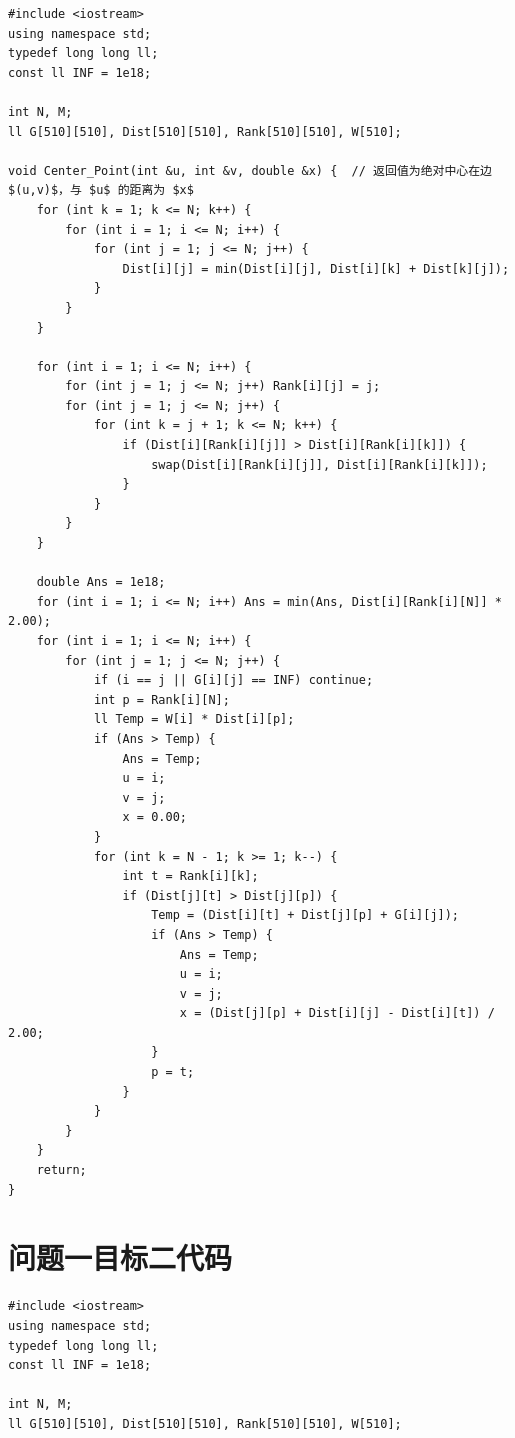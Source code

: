 \documentclass{cumcmthesis}
\begin{document}
\begin{appendices}
\begin{lstlisting}
#include <iostream>
using namespace std;
typedef long long ll;
const ll INF = 1e18;

int N, M;
ll G[510][510], Dist[510][510], Rank[510][510], W[510];

void Center_Point(int &u, int &v, double &x) {  // 返回值为绝对中心在边 $(u,v)$，与 $u$ 的距离为 $x$
    for (int k = 1; k <= N; k++) {
        for (int i = 1; i <= N; i++) {
            for (int j = 1; j <= N; j++) {
                Dist[i][j] = min(Dist[i][j], Dist[i][k] + Dist[k][j]);
            }
        }
    }

    for (int i = 1; i <= N; i++) {
        for (int j = 1; j <= N; j++) Rank[i][j] = j;
        for (int j = 1; j <= N; j++) {
            for (int k = j + 1; k <= N; k++) {
                if (Dist[i][Rank[i][j]] > Dist[i][Rank[i][k]]) {
                    swap(Dist[i][Rank[i][j]], Dist[i][Rank[i][k]]);
                }
            }
        }
    }

    double Ans = 1e18;
    for (int i = 1; i <= N; i++) Ans = min(Ans, Dist[i][Rank[i][N]] * 2.00);
    for (int i = 1; i <= N; i++) {
        for (int j = 1; j <= N; j++) {
            if (i == j || G[i][j] == INF) continue;
            int p = Rank[i][N];
            ll Temp = W[i] * Dist[i][p];
            if (Ans > Temp) {
                Ans = Temp;
                u = i;
                v = j;
                x = 0.00;
            }
            for (int k = N - 1; k >= 1; k--) {
                int t = Rank[i][k];
                if (Dist[j][t] > Dist[j][p]) {
                    Temp = (Dist[i][t] + Dist[j][p] + G[i][j]);
                    if (Ans > Temp) {
                        Ans = Temp;
                        u = i;
                        v = j;
                        x = (Dist[j][p] + Dist[i][j] - Dist[i][t]) / 2.00;
                    }
                    p = t;
                }
            }
        }
    }
    return;
}
\end{lstlisting}

\section{问题一目标二代码}

\begin{lstlisting}
#include <iostream>
using namespace std;
typedef long long ll;
const ll INF = 1e18;

int N, M;
ll G[510][510], Dist[510][510], Rank[510][510], W[510];


\end{lstlisting}
\end{appendices}
\end{document}
